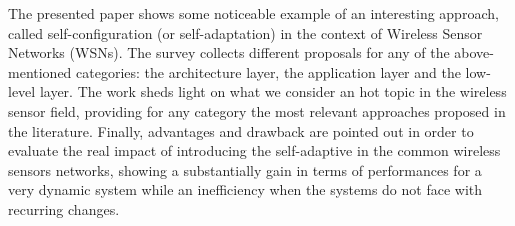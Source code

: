The presented paper shows some noticeable example of an interesting approach, called self-configuration (or self-adaptation) in the context of Wireless Sensor Networks (WSNs). The survey collects different proposals for any of the above-mentioned categories: the architecture layer, the application layer and the low-level layer.
The work sheds light on what we consider an hot topic in the wireless sensor field, providing for any category the most relevant approaches proposed in the literature.
Finally, advantages and drawback are pointed out in order to evaluate the real impact of introducing the self-adaptive in the common wireless sensors networks, showing a substantially gain in terms of performances for a very dynamic system while an inefficiency when the systems do not face with recurring changes.